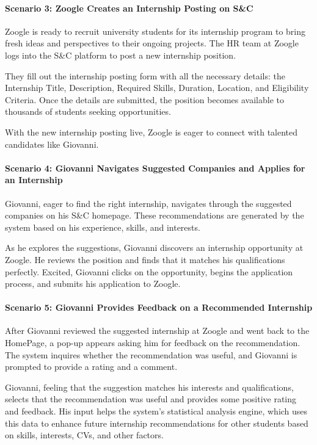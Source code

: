 \paragraph{Scenario 3: Zoogle Creates an Internship Posting on S\&C}

Zoogle is ready to recruit university students for its internship
program to bring fresh ideas and perspectives to their ongoing projects.
The HR team at Zoogle logs into the S\&C platform to post a new
internship position.

They fill out the internship posting form with all the necessary
details: the Internship Title, Description, Required Skills, Duration,
Location, and Eligibility Criteria. Once the details are submitted, the
position becomes available to thousands of students seeking
opportunities.

With the new internship posting live, Zoogle is eager to connect with
talented candidates like Giovanni.


\paragraph{Scenario 4: Giovanni Navigates Suggested Companies and Applies
for an Internship}

Giovanni, eager to find the right internship, navigates through the
suggested companies on his S\&C homepage. These recommendations are
generated by the system based on his experience, skills, and interests.

As he explores the suggestions, Giovanni discovers an internship
opportunity at Zoogle. He reviews the position and finds that it matches
his qualifications perfectly. Excited, Giovanni clicks on the
opportunity, begins the application process, and submits his application
to Zoogle.


\paragraph{Scenario 5: Giovanni Provides Feedback on a Recommended
Internship}

After Giovanni reviewed the suggested internship at Zoogle and went back
to the HomePage, a pop-up appears asking him for feedback on the
recommendation. The system inquires whether the recommendation was
useful, and Giovanni is prompted to provide a rating and a comment.

Giovanni, feeling that the suggestion matches his interests and
qualifications, selects that the recommendation was useful and provides
some positive rating and feedback. His input helps the
system's statistical analysis engine, which uses this
data to enhance future internship recommendations for other students
based on skills, interests, CVs, and other factors.

